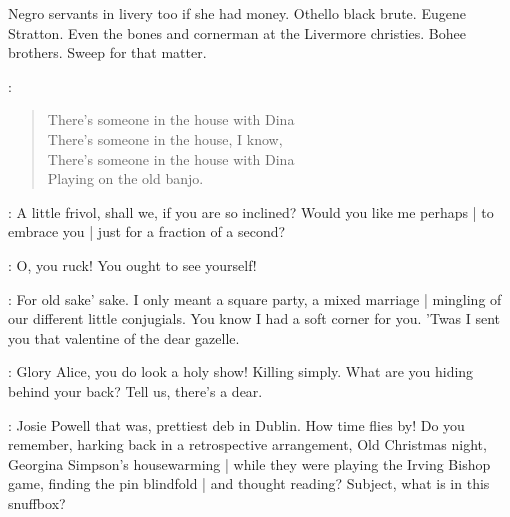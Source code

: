 \begin{omitted}
Negro servants in livery too if she had money.
Othello black brute.
Eugene Stratton.
Even the bones and cornerman at the Livermore christies.
Bohee brothers.
Sweep for that matter.


\Bohees:
\begin{verse}
%
    There's someone in the house with Dina\\
    There's someone in the house, I know,\\
    There's someone in the house with Dina\\
    Playing on the old banjo.
\end{verse}

\end{omitted}

\Bloom:
A little frivol,
shall we,
if you are so inclined?
Would you like me perhaps |
to embrace you |
just for a fraction of a second?

\MrsBreen:
O,
you ruck!
You ought to see yourself!

\Bloom:
For old sake' sake.
I only meant a square party,
a mixed marriage |
mingling of our different little conjugials.
You know I had a soft corner for you.
'Twas I sent you that valentine of the dear gazelle.

\MrsBreen:
Glory Alice,
you do look a holy show!
Killing simply.
What are you hiding behind your back?
Tell us,
there's a dear.

\Bloom:
Josie Powell that was,
prettiest deb in Dublin.
How time flies by!
Do you remember,
harking back in a retrospective arrangement,
Old Christmas night,
Georgina Simpson's housewarming |
while they were playing the Irving Bishop game,
finding the pin blindfold |
and thought reading?
Subject,
what is in this snuffbox?

